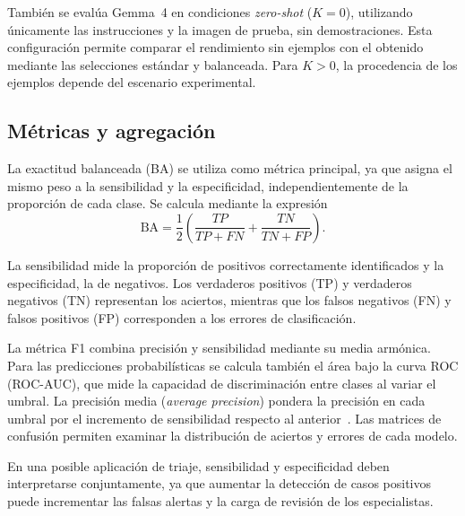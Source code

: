También se evalúa Gemma~4 en condiciones \emph{zero-shot} (\(K=0\)), utilizando únicamente las instrucciones y la imagen de prueba, sin demostraciones. Esta configuración permite comparar el rendimiento sin ejemplos con el obtenido mediante las selecciones estándar y balanceada. Para \(K>0\), la procedencia de los ejemplos depende del escenario experimental.

\subsection{Métricas y agregación}
\label{sec:metricas}

La exactitud balanceada (BA) se utiliza como métrica principal, ya que asigna el mismo peso a la sensibilidad y la especificidad, independientemente de la proporción de cada clase. Se calcula mediante la expresión
\[
  \mathrm{BA}=\frac{1}{2}\left(\frac{TP}{TP+FN}+\frac{TN}{TN+FP}\right).
\]

La sensibilidad mide la proporción de positivos correctamente identificados y la especificidad, la de negativos. Los verdaderos positivos (TP) y verdaderos negativos (TN) representan los aciertos, mientras que los falsos negativos (FN) y falsos positivos (FP) corresponden a los errores de clasificación.

La métrica F1 combina precisión y sensibilidad mediante su media armónica. Para las predicciones probabilísticas se calcula también el área bajo la curva ROC (ROC-AUC), que mide la capacidad de discriminación entre clases al variar el umbral. La precisión media (\textit{average precision}) pondera la precisión en cada umbral por el incremento de sensibilidad respecto al anterior~\cite{sklearnaverageprecision}. Las matrices de confusión permiten examinar la distribución de aciertos y errores de cada modelo.

En una posible aplicación de triaje, sensibilidad y especificidad deben interpretarse conjuntamente, ya que aumentar la detección de casos positivos puede incrementar las falsas alertas y la carga de revisión de los especialistas.
